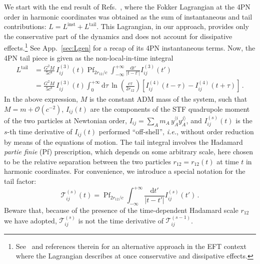 \documentclass[prd,preprint,superscriptaddress,tightenlines,nofootinbib,
  eqsecnum,showpacs]{revtex4}
\newcommand{\ud}{\mathrm{d}}
\begin{document}
We start with the end result of Refs.~\cite{BBBFMa, BBBFMb}, where the
Fokker Lagrangian at the 4PN order in harmonic coordinates was obtained as the sum of
instantaneous and tail contributions: $L = L^\text{inst} + L^\text{tail}$.
This Lagrangian,  in
our approach, provides only the
conservative part of the dynamics and does not account for dissipative effects.\footnote{See~\cite{GLPR16} and references therein for an
  alternative approach in the EFT context where the Lagrangian describes at
  once conservative and dissipative effects.} See
App.~\ref{sec:Lgen} for a recap of its 4PN instantaneous terms. Now, the 4PN
tail piece is given as the non-local-in-time integral
%
\begin{align}\label{Ltail}
L^\text{tail} &= \frac{G^2M}{5c^8}
\,I_{ij}^{(3)}(t)\!\mathop{\text{Pf}}_{2r_{12}/c}
\int_{-\infty}^{+\infty} \frac{\ud t'}{\vert t-t'\vert}
I_{ij}^{(3)}(t')\nonumber\\&= \frac{G^2M}{5c^8}
\,I_{ij}^{(3)}(t) \int_0^{+\infty} \! \ud\tau \,
\ln{\left( \frac{c\tau}{2 r_{12}} \right)} \left[ I_{ij}^{(4)}(t-\tau)
  - I_{ij}^{(4)}(t+\tau) \right]\,.
\end{align}
%
In the above expression, $M$ is the constant ADM mass of the system, such that
$M=m+\mathcal{O}(c^{-2})$, $I_{ij}(t)$ are the components of the STF
quadrupole moment of the two particles at Newtonian order,
$I_{ij} = \sum_A m_A \,y_A^{\langle i} y_A^{j\rangle}$, and $I_{ij}^{(s)}(t)$
is the $s$-th time derivative of $I_{ij}(t)$ performed ``off-shell'',
\textit{i.e.}, without order reduction by means of the equations of motion. The tail
integral involves the Hadamard \textit{partie finie} (Pf) prescription, which
depends on some arbitrary scale, here chosen to be the relative separation
between the two particles $r_{12}=r_{12}(t)$ at time $t$ in harmonic
coordinates. For convenience, we introduce a special notation for the tail
factor:
%
\begin{equation}\label{tailfactor}
\mathcal{T}_{ij}^{(s)}(t) = \mathop{\text{Pf}}_{2r_{12}/c}
\int_{-\infty}^{+\infty} \frac{\ud t'}{\vert t-t'\vert}
I_{ij}^{(s)}(t')\,.
\end{equation}
% 
Beware that, because of the presence of the time-dependent Hadamard scale
$r_{12}$ we have adopted, $\mathcal{T}_{ij}^{(s)}$ is not the time derivative of
$\mathcal{T}_{ij}^{(s-1)}$.
\end{document}
